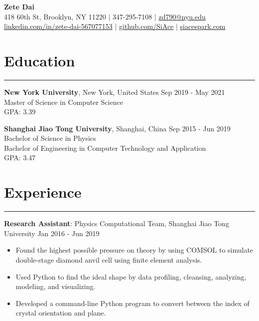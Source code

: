 \documentclass{article}
\begin{document}

\begin{center}
  {\Large\textbf{Zete Dai}} \\
  418 60th St, Brooklyn, NY 11220 $|$
  347-295-7108 $|$
  \href{mailto:zd790@nyu.edu}{zd790@nyu.edu} \\
  \href{https://www.linkedin.com/in/zete-dai-567077153/}{linkedin.com/in/zete-dai-567077153} $|$
  \href{https://github.com/SiAce}{github.com/SiAce} $|$
  \href{https://www.siacespark.com}{siacespark.com}
  
\end{center}

\section{Education}
\hrule
\vspace{1em}

\textbf{New York University}, New York, United States \hfill
Sep 2019 - May 2021 \\
Master of Science in Computer Science \\
GPA: 3.39

\vspace{1em}

\textbf{Shanghai Jiao Tong University}, Shanghai, China \hfill
Sep 2015 - Jun 2019 \\
Bachelor of Science in Physics \\
Bachelor of Engineering in Computer Technology and Application \\
GPA: 3.47

\section{Experience}
\hrule
\vspace{1em}

\textbf{Research Assistant}: Physics Computational Team, Shanghai Jiao Tong University \hfill
Jan 2016 - Jun 2019

\begin{itemize}[nosep]
	\item Found the highest possible pressure on theory by using COMSOL to simulate double-stage diamond anvil cell
	using finite element analysis.
	\item Used Python to find the ideal shape by data profiling, cleansing, analyzing, modeling, and visualizing.
	\item Developed a command-line Python program to convert between the index of crystal orientation and plane.
\end{itemize}
\end{document}
